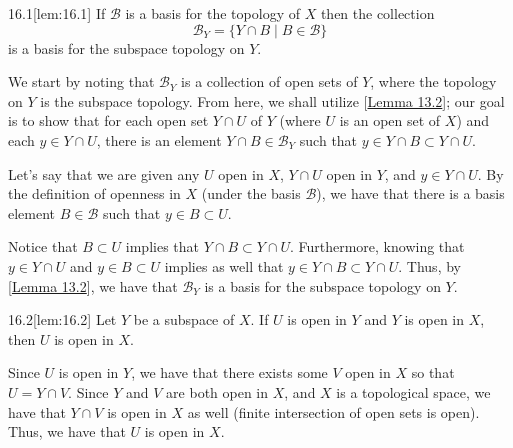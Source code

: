 \begin{thmBox}[Lemma]{16.1}[lem:16.1]
    If \( \mathcal{B} \) is a basis for the topology of \( X \) then the 
    collection 
    \begin{equation*}
        \mathcal{B}_{ Y }
        =
        \{ Y \cap B \mid B \in \mathcal{B} \}
    \end{equation*}
    is a basis for the subspace topology on \( Y \).

    \baseRule

    \begin{proofBox}
        We start by noting that \( \mathcal{B}_{ Y } \) is a collection of open 
        sets of \( Y \), where the topology on \( Y \) is the subspace topology.
        From here, we shall utilize [\hyperlink{lem:13.2}{Lemma 13.2}]; our goal
        is to show that for each open set \( Y \cap U \) of \( Y \) (where 
        \( U \) is an open set of \( X \)) and each \( y \in Y \cap U \), there 
        is an element \( Y \cap B \in \mathcal{B}_{ Y } \) such that 
        \( y \in Y \cap B \subset Y \cap U \).

        \baseSkip

        Let's say that we are given any \( U \) open in \( X \), \( Y \cap U \)
        open in \( Y \), and \( y \in Y \cap U \).
        By the definition of openness in \( X \) (under the basis 
        \( \mathcal{B} \)), we have that there is a basis element 
        \( B \in \mathcal{B} \) such that \( y \in B \subset U \).

        \baseSkip 
        
        Notice that \( B \subset U \) implies that \( Y \cap B \subset 
        Y \cap U \).
        Furthermore, knowing that \( y \in Y \cap U \) and 
        \( y \in B \subset U \) implies as well that \( y \in Y \cap B \subset 
        Y \cap U \).
        Thus, by [\hyperlink{lem:13.2}{Lemma 13.2}], we have that 
        \( \mathcal{B}_{ Y } \) is a basis for the subspace topology on \( Y \).
    \end{proofBox}
\end{thmBox}

\begin{thmBox}[Lemma]{16.2}[lem:16.2]
    Let \( Y \) be a subspace of \( X \). 
    If \( U \) is open in \( Y \) and \( Y \) is open in \( X \), then 
    \( U \) is open in \( X \).

    \baseRule

    \begin{proofBox}
        Since \( U \) is open in \( Y \), we have that there exists some \( V \)
        open in \( X \) so that \( U = Y \cap V \).
        Since \( Y \) and \( V \) are both open in \( X \), and \( X \) is a 
        topological space, we have that \( Y \cap V \) is open in \( X \) as 
        well (finite intersection of open sets is open).
        Thus, we have that \( U \) is open in \( X \).
    \end{proofBox}
\end{thmBox}

